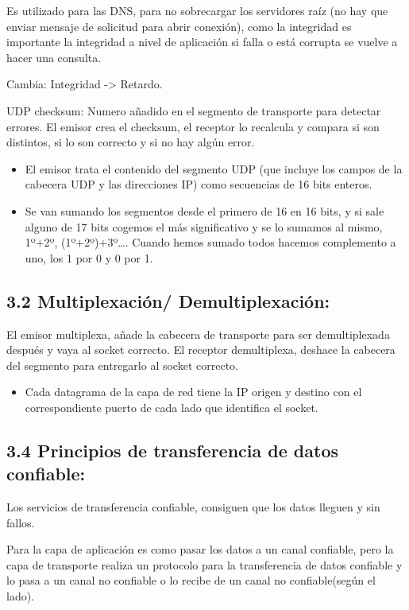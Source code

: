 \documentclass[12pt, twoside, openright]{report} %
\begin{document}
Es utilizado para las DNS, para no sobrecargar los servidores raíz
(no hay que enviar mensaje de solicitud para abrir conexión), como
la integridad es importante la integridad a nivel de aplicación si
falla o está corrupta se vuelve a hacer una consulta.

Cambia: Integridad -\textgreater{} Retardo.

UDP checksum: Numero añadido en el segmento de transporte para
detectar errores. El emisor crea el checksum, el receptor lo
recalcula y compara si son distintos, si lo son correcto y si no hay
algún error.

\begin{itemize}
	\item El emisor trata el contenido del segmento UDP (que incluye los
	      campos de la cabecera UDP y las direcciones IP) como secuencias de
	      16 bits enteros.
	\item Se van sumando los segmentos desde el primero de 16 en 16 bits, y
	      si sale alguno de 17 bits cogemos el más significativo y se lo
	      sumamos al mismo, 1º+2º, (1º+2º)+3º\ldots. Cuando hemos sumado
	      todos hacemos complemento a uno, los 1 por 0 y 0 por 1.
\end{itemize}

\subsection{3.2 Multiplexación/ Demultiplexación:}


El emisor multiplexa, añade la cabecera de transporte para ser
demultiplexada después y vaya al socket correcto.
El receptor demultiplexa, deshace la cabecera del segmento para
entregarlo al socket correcto.

\begin{itemize}
	\item Cada datagrama de la capa de red tiene la IP origen y destino con
	      el correspondiente puerto de cada lado que identifica el socket.
\end{itemize}

\subsection{3.4 Principios de transferencia de datos confiable:}

Los servicios de transferencia confiable, consiguen que los datos
lleguen y sin fallos.

Para la capa de aplicación es como pasar los datos a un canal
confiable, pero la capa de transporte realiza un protocolo para la
transferencia de datos confiable y lo pasa a un canal no confiable o
lo recibe de un canal no confiable(según el lado).
\end{document}
